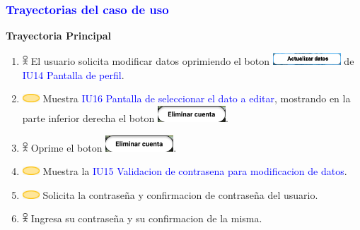 \pagebreak
\subsubsection{\textcolor{blue}{Trayectorias del caso de uso}}
\textbf{Trayectoria Principal}
    \begin{enumerate}
        \item \includegraphics[width=0.0150\textwidth]{Figuras/persona.png} El usuario solicita modificar datos oprimiendo el boton \includegraphics[width=0.2\textwidth]{ComponentesCU/AD.png}  de \textcolor{blue}{IU14 Pantalla de perfil}.
        \item \includegraphics[width=0.0500\textwidth]{Figuras/sistema.png} Muestra \textcolor{blue}{IU16 Pantalla de seleccionar el dato a editar}, mostrando en la parte inferior derecha el boton \includegraphics[width=0.2\textwidth]{ComponentesCU/img.png}.
        \item \includegraphics[width=0.0150\textwidth]{Figuras/persona.png} Oprime el boton \includegraphics[width=0.2\textwidth]{ComponentesCU/img.png}.
         \item \includegraphics[width=0.0500\textwidth]{Figuras/sistema.png} Muestra la \textcolor{blue}{IU15 Validacion de contrasena para modificacion de datos}.
        \item \includegraphics[width=0.0500\textwidth]{Figuras/sistema.png} Solicita la contraseña y confirmacion de contraseña del usuario.
        \item \includegraphics[width=0.0150\textwidth]{Figuras/persona.png} Ingresa su contraseña y su confirmacion de la misma.

\end{enumerate}
